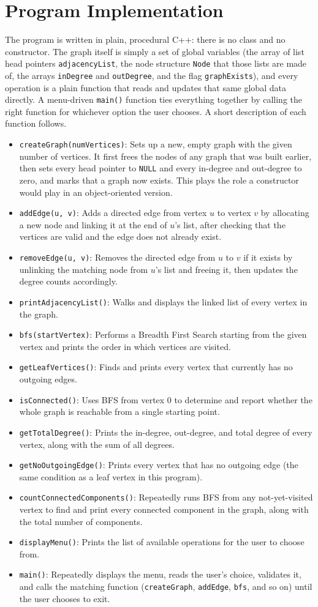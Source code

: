 \documentclass[11pt]{article}
\newcommand{\func}[2]{\item \texttt{#1}: #2}
\begin{document}
\section{Program Implementation}

The program is written in plain, procedural C++: there is no class and no constructor. The graph itself is simply a set of global variables (the array of list head pointers \texttt{adjacencyList}, the node structure \texttt{Node} that those lists are made of, the arrays \texttt{inDegree} and \texttt{outDegree}, and the flag \texttt{graphExists}), and every operation is a plain function that reads and updates that same global data directly. A menu-driven \texttt{main()} function ties everything together by calling the right function for whichever option the user chooses. A short description of each function follows.

\begin{itemize}[topsep=2pt, itemsep=3pt]
  \func{createGraph(numVertices)}{Sets up a new, empty graph with the given number of vertices. It first frees the nodes of any graph that was built earlier, then sets every head pointer to \texttt{NULL} and every in-degree and out-degree to zero, and marks that a graph now exists. This plays the role a constructor would play in an object-oriented version.}
  \func{addEdge(u, v)}{Adds a directed edge from vertex $u$ to vertex $v$ by allocating a new node and linking it at the end of $u$'s list, after checking that the vertices are valid and the edge does not already exist.}
  \func{removeEdge(u, v)}{Removes the directed edge from $u$ to $v$ if it exists by unlinking the matching node from $u$'s list and freeing it, then updates the degree counts accordingly.}
  \func{printAdjacencyList()}{Walks and displays the linked list of every vertex in the graph.}
  \func{bfs(startVertex)}{Performs a Breadth First Search starting from the given vertex and prints the order in which vertices are visited.}
  \func{getLeafVertices()}{Finds and prints every vertex that currently has no outgoing edges.}
  \func{isConnected()}{Uses BFS from vertex 0 to determine and report whether the whole graph is reachable from a single starting point.}
  \func{getTotalDegree()}{Prints the in-degree, out-degree, and total degree of every vertex, along with the sum of all degrees.}
  \func{getNoOutgoingEdge()}{Prints every vertex that has no outgoing edge (the same condition as a leaf vertex in this program).}
  \func{countConnectedComponents()}{Repeatedly runs BFS from any not-yet-visited vertex to find and print every connected component in the graph, along with the total number of components.}
  \func{displayMenu()}{Prints the list of available operations for the user to choose from.}
  \func{main()}{Repeatedly displays the menu, reads the user's choice, validates it, and calls the matching function (\texttt{createGraph}, \texttt{addEdge}, \texttt{bfs}, and so on) until the user chooses to exit.}
\end{itemize}
\end{document}

